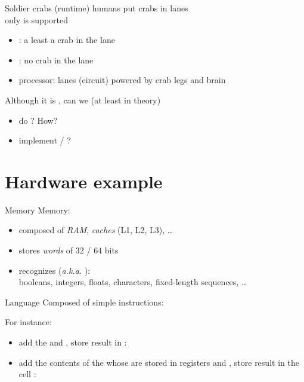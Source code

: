 \documentclass[10pt]{beamer}
\begin{document}
\begin{frame}{Soldier crabs (runtime)}
   humans put crabs in lanes
  \\\bigskip
   only  is supported
  \begin{itemize}
  \item {}: a least a crab in the lane
  \item {}: no crab in the lane
  \item processor: lanes (circuit) powered by crab legs and brain
  \end{itemize}
  \bigskip
  \pause
  Although it is , can we (at least in theory)
  \begin{itemize}
  \item do ? How?
  \item implement  / ?
  \end{itemize}
\end{frame}




\section{Hardware example}



\begin{frame}{Memory}
  Memory:
  \begin{itemize}
  \item composed of \emph{RAM}, \emph{caches} (L1, L2, L3), \ldots
  \item stores \emph{words} of $32$ / $64$ bits
  \item recognizes 
    (\textit{a.k.a.} ):\\
    booleans, integers, floats, characters, fixed-length sequences, \ldots
  \end{itemize}
\end{frame}


\begin{frame}{Language}
  Composed of simple instructions:
  \centerline{  }

  \smallskip
  For instance:
  \begin{itemize}
  \item add the   and , store result
    in :\\
    \centerline{  }
  \item add the contents of the  whose 
    are stored in registers  and , store result in the cell
     :\\
    \centerline{  }
  \end{itemize}
\end{frame}
\end{document}
